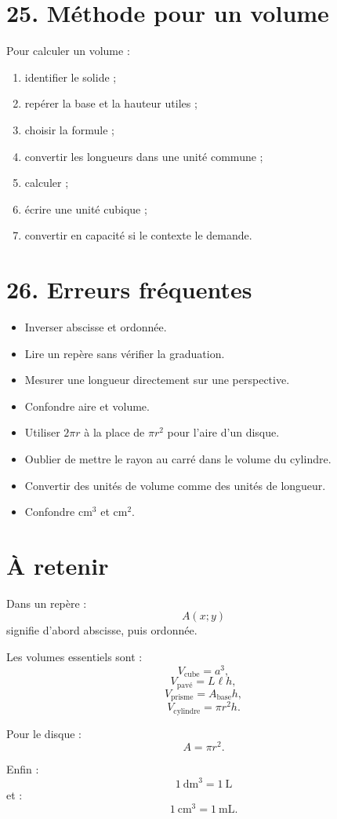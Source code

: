 \section{25. Méthode pour un volume}

\begin{methode}
Pour calculer un volume :
\begin{enumerate}
\item identifier le solide ;
\item repérer la base et la hauteur utiles ;
\item choisir la formule ;
\item convertir les longueurs dans une unité commune ;
\item calculer ;
\item écrire une unité cubique ;
\item convertir en capacité si le contexte le demande.
\end{enumerate}
\end{methode}

\section{26. Erreurs fréquentes}

\begin{itemize}
\item Inverser abscisse et ordonnée.
\item Lire un repère sans vérifier la graduation.
\item Mesurer une longueur directement sur une perspective.
\item Confondre aire et volume.
\item Utiliser $2\pi r$ à la place de $\pi r^2$ pour l'aire d'un disque.
\item Oublier de mettre le rayon au carré dans le volume du cylindre.
\item Convertir des unités de volume comme des unités de longueur.
\item Confondre $\text{cm}^3$ et $\text{cm}^2$.
\end{itemize}

\section{À retenir}

\begin{aretenir}
Dans un repère :
\[
\boxed{A(x;y)}
\]
signifie d'abord abscisse, puis ordonnée.

Les volumes essentiels sont :
\[
\boxed{V_{\text{cube}}=a^3},
\]
\[
\boxed{V_{\text{pavé}}=L\ell h},
\]
\[
\boxed{V_{\text{prisme}}=A_{\text{base}}h},
\]
\[
\boxed{V_{\text{cylindre}}=\pi r^2h}.
\]

Pour le disque :
\[
\boxed{A=\pi r^2}.
\]

Enfin :
\[
\boxed{1\ \text{dm}^3=1\ \text{L}}
\]
et :
\[
\boxed{1\ \text{cm}^3=1\ \text{mL}}.
\]
\end{aretenir}
